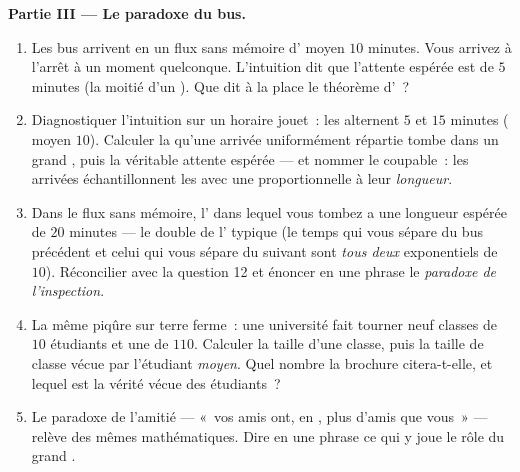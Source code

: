 \begin{problem}
\medskip
\noindent\textbf{Partie III --- Le paradoxe du bus.}
\begin{enumerate}[resume]
  \item Les bus arrivent en un flux sans mémoire d' moyen
        $10$ minutes. Vous arrivez à l'arrêt à un moment
        quelconque. L'intuition dit que l'attente espérée est de
        $5$ minutes (la moitié d'un ). Que dit à la place
        le théorème d'~?
  \item Diagnostiquer l'intuition sur un horaire jouet~: les
         alternent $5$ et $15$ minutes ( moyen
        $10$). Calculer la  qu'une arrivée uniformément
        répartie tombe dans un grand , puis la véritable
        attente espérée --- et nommer le coupable~: les arrivées
        échantillonnent les  avec une 
        proportionnelle à leur \emph{longueur}.
  \item Dans le flux sans mémoire, l' dans lequel vous
        tombez a une longueur espérée de $20$ minutes --- le double
        de l' typique (le temps qui vous sépare du bus
        précédent et celui qui vous sépare du suivant sont
        \emph{tous deux} exponentiels de  $10$). Réconcilier
        avec la question 12 et énoncer en une phrase le
        \emph{paradoxe de l'inspection}.
  \item La même piqûre sur terre ferme~: une université fait
        tourner neuf classes de $10$ étudiants et une de $110$.
        Calculer la taille  d'une classe, puis la taille de
        classe vécue par l'étudiant \emph{moyen}. Quel nombre la
        brochure citera-t-elle, et lequel est la vérité vécue des
        étudiants~?
  \item Le paradoxe de l'amitié --- «~vos amis ont, en ,
        plus d'amis que vous~» --- relève des mêmes mathématiques.
        Dire en une phrase ce qui y joue le rôle du grand
        .
\end{enumerate}


\end{problem}
